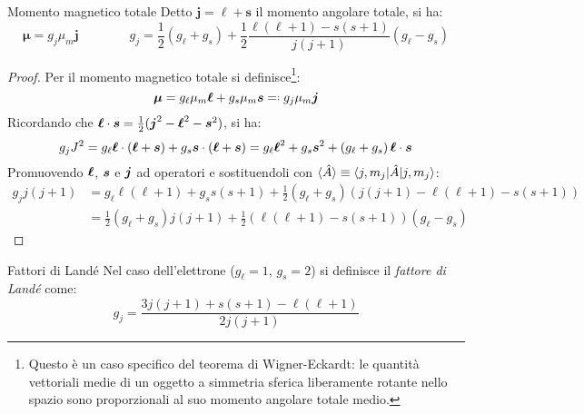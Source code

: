 \begin{proposition}{Momento magnetico totale}{}
	Detto $ \boldsymbol{j} = \boldsymbol{\ell} + \boldsymbol{s} $ il momento angolare totale, si ha:
	\begin{equation}
		\boldsymbol{\mu} = g_j \mu_m \boldsymbol{j}
		\qquad \qquad
		g_j = \frac{1}{2} \left( g_\ell + g_s \right) + \frac{1}{2} \frac{\ell (\ell + 1) - s (s + 1)}{j (j + 1)} \left( g_\ell - g_s \right)
	\end{equation}

	\tcblower

	\begin{proof}
		Per il momento magnetico totale si definisce\footnote{Questo è un caso specifico del teorema di Wigner-Eckardt: le quantità vettoriali medie di un oggetto a simmetria sferica liberamente rotante nello spazio sono proporzionali al suo momento angolare totale medio.}:
		\begin{equation*}
			\bs{\mu} = g_\ell \mu_m \bs{\ell} + g_s \mu_m \bs{s} \eqdef g_j \mu_m \bs{j}
		\end{equation*}
		Ricordando che $ \boldsymbol{\ell} \cdot \boldsymbol{s} = \frac{1}{2} ( \boldsymbol{j}^2 - \boldsymbol{\ell}^2 - \boldsymbol{s}^2 ) $, si ha:
		\begin{equation*}
			g_j J^2 = g_\ell \boldsymbol{\ell} \cdot \left( \boldsymbol{\ell} + \boldsymbol{s} \right) + g_s \boldsymbol{s} \cdot \left( \boldsymbol{\ell} + \boldsymbol{s} \right) = g_\ell \boldsymbol{\ell}^2 + g_s \boldsymbol{s}^2 + \left( g_\ell + g_s \right) \boldsymbol{\ell} \cdot \boldsymbol{s}
		\end{equation*}
		Promuovendo $ \boldsymbol{\ell} $, $ \boldsymbol{s} $ e $ \boldsymbol{j} $ ad operatori e sostituendoli con $ \braket{\hat{A}} \equiv \braket{j,m_j | \hat{A} | j,m_j} $:
		\begin{equation*}
			\begin{split}
				g_j j (j + 1)
				&= g_\ell \ell (\ell + 1) + g_s s (s + 1) + \frac{1}{2} \left( g_\ell + g_s \right) \left( j (j + 1) - \ell (\ell + 1) - s (s + 1) \right) \\
				&= \frac{1}{2} \left( g_\ell + g_s \right) j (j + 1) + \frac{1}{2} \left( \ell (\ell + 1) - s (s + 1) \right) \left( g_\ell - g_s \right)
			\end{split}
		\end{equation*}
	\end{proof}
\end{proposition}

\begin{definition}{Fattori di Landé}{}
	Nel caso dell'elettrone ($ g_\ell = 1 $, $ g_s = 2 $) si definisce il \textit{fattore di Landé} come:
	\begin{equation}
		g_j = \frac{3 j (j + 1) + s (s + 1) - \ell (\ell + 1)}{2 j (j + 1)}
		\label{eq:lande-g-factor}
	\end{equation}
\end{definition}

